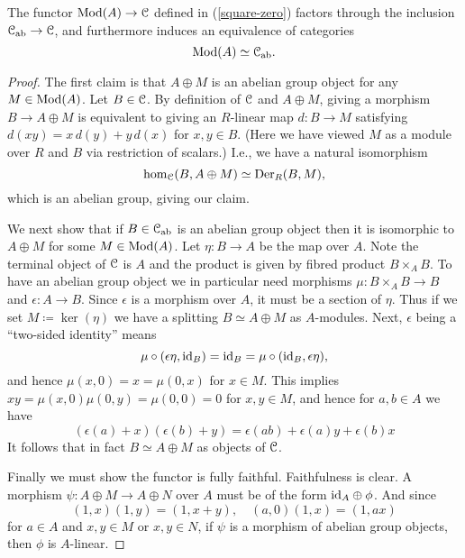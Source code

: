 \begin{proposition}
  \label{modules-abelian}
  The functor $\mathrm{Mod}(A) \to \mathcal{C}$ defined in (\ref{square-zero}) factors
  through the inclusion $\mathcal{C}_{\mathrm{ab}} \to \mathcal{C}$, and furthermore induces an
  equivalence of categories
  \[
  \mathrm{Mod}(A) \simeq \mathcal{C}_{\mathrm{ab}}.
  \]
\end{proposition}

\begin{proof}
  The first claim is that $A \oplus M$ is an abelian group object for
  any $M \in \mathrm{Mod}(A)$. Let $B \in \mathcal{C}$. By definition of $\mathcal{C}$ and $A
  \oplus M$, giving a morphism $B \to A \oplus M$ is equivalent to
  giving an $R$-linear map $d : B \to M$ satisfying $d(xy) = x\,d(y) +
  y\,d(x)$ for $x,y \in B$. (Here we have viewed $M$ as a module over
  $R$ and $B$ via restriction of scalars.) I.e., we have a natural
  isomorphism
  \begin{equation}
    \label{sqzero-der}
    \operatorname{hom}_{\mathcal{C}}(B, A \oplus M) \simeq \operatorname{Der}_R(B,M),
  \end{equation}
  which is an abelian group, giving our claim.

  We next show that if $B \in \mathcal{C}_{\mathrm{ab}}$ is an abelian group object
  then it is isomorphic to $A \oplus M$ for some $M \in \mathrm{Mod}(A)$. Let
  $\eta : B \to A$ be the map over $A$. Note the terminal object of
  $\mathcal{C}$ is $A$ and the product is given by fibred product $B \times_A
  B$. To have an abelian group object we in particular need morphisms
  $\mu : B \times_A B \to B$ and $\epsilon : A \to B$.  Since
  $\epsilon$ is a morphism over $A$, it must be a section of
  $\eta$. Thus if we set $M \coloneqq \ker(\eta)$ we have a splitting
  $B \simeq A \oplus M$ as $A$-modules. Next, $\epsilon$ being a
  ``two-sided identity'' means
  \[
  \mu \circ (\epsilon \eta, \mathrm{id}_B) = \mathrm{id}_B = \mu \circ (\mathrm{id}_B,
  \epsilon \eta),
  \]
  and hence $\mu(x,0) = x = \mu(0,x)$ for $x \in M$. This implies $xy
  = \mu(x,0)\mu(0,y) = \mu(0,0) = 0$ for $x,y \in M$, and hence for
  $a,b \in A$ we have
  \[
  (\epsilon(a)+x)(\epsilon(b)+y) = \epsilon(ab) + \epsilon(a)y +
  \epsilon(b)x
  \]
  It follows that in fact $B \simeq A \oplus M$ as objects of $\mathcal{C}$.

  Finally we must show the functor is fully faithful. Faithfulness is
  clear. A morphism $\psi : A \oplus M \to A \oplus N$ over $A$ must
  be of the form $\mathrm{id}_A \oplus \phi$. And since
  \[
  (1,x)(1,y) = (1,x+y), \quad (a,0)(1,x) = (1,ax)
  \]
  for $a \in A$ and $x,y \in M$ or $x,y \in N$, if $\psi$ is a
  morphism of abelian group objects, then $\phi$ is $A$-linear.
\end{proof}

